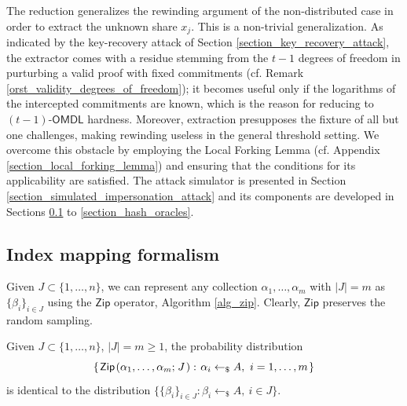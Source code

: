 \documentclass{iacrtrans}
\begin{document}
The reduction generalizes the rewinding argument
of the non-distributed case
in order to extract the unknown share $x_j$.
This is a non-trivial generalization.
As indicated by the key-recovery attack
of Section \ref{section_key_recovery_attack},
the extractor comes with a residue
stemming from the $t-1$ degrees of freedom in purturbing a valid proof
with fixed commitments
(cf. Remark \ref{orst_validity_degrees_of_freedom});
it becomes useful only if the logarithms
of the intercepted commitments
are known,
which is the reason for reducing to
$(t-1)$-$\textsf{OMDL}$ hardness.
Moreover, extraction presupposes the fixture of
all but one challenges,
making rewinding useless
in the general threshold setting. We overcome this obstacle
by employing the Local Forking Lemma
(cf. Appendix \ref{section_local_forking_lemma})
and ensuring that the conditions for its applicability
are satisfied. The attack simulator is presented
in Section \ref{section_simulated_impersonation_attack}
and its components are developed in Sections
\ref{section_index_mapping} to
\ref{section_hash_oracles}.


\subsection{Index mapping formalism}\label{section_index_mapping}

Given $J \subset \{1, \dots, n\}$,
we can represent any collection
$\alpha_1, \dots, \alpha_m$ with $|J|=m$
as $\{\beta_i\}_{i \in J}$ using the
$\mathsf{Zip}$ operator, Algorithm \ref{alg_zip}.
Clearly, $\mathsf{Zip}$ preserves the random sampling.

\begin{lemma}\label{zip_lemma}
Given $J \subset \{1, \dots, n\}$, $|J| = m \ge 1$,
the probability distribution
\vspace{5pt}
\begin{equation*}
\{\hspace{1pt}
\mathsf{Zip}\hspace{1pt}(
\alpha_1, \dots, \alpha_m;\hspace{1pt} J\hspace{1pt}):
\hspace{1pt}\alpha_i \leftarrow_\$ A,
\ i = 1, \dots, m
\hspace{1pt}\}
\vspace{5pt}
\end{equation*}
is identical to the distribution
$\{\{\beta_i\}_{i \in J}: \beta_i \leftarrow_\$ A,\ i \in J\}$.
\end{lemma}
\end{document}
